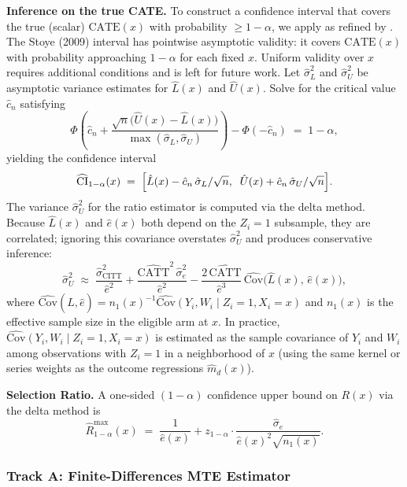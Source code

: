 \documentclass[11pt]{article}
\begin{document}
\textbf{Inference on the true CATE.}  To construct a confidence interval that
covers the true (scalar) $\mathrm{CATE}(x)$ with probability $\geq 1-\alpha$,
we apply \citet{imbens2004confidence} as refined by \citet{stoye2009more}.
The Stoye (2009) interval has pointwise asymptotic validity: it covers
$\mathrm{CATE}(x)$ with probability approaching $1-\alpha$ for each fixed $x$.
Uniform validity over $x$ requires additional conditions and is left for future
work.
Let $\hat{\sigma}_L^2$ and $\hat{\sigma}_U^2$ be asymptotic variance estimates
for $\hat{L}(x)$ and $\hat{U}(x)$.  Solve for the critical value $\hat{c}_n$
satisfying
\[
  \Phi\!\left(\hat{c}_n + \frac{\sqrt{n}\bigl(\hat{U}(x) -
  \hat{L}(x)\bigr)}{\max(\hat{\sigma}_L,\hat{\sigma}_U)}\right) -
  \Phi(-\hat{c}_n) \;=\; 1-\alpha,
\]
yielding the confidence interval
\[
  \widehat{\mathrm{CI}}_{1-\alpha}(x) \;=\; \Bigl[\hat{L}(x) -
  \hat{c}_n\,\hat{\sigma}_L/\sqrt{n},\;\;
  \hat{U}(x) + \hat{c}_n\,\hat{\sigma}_U/\sqrt{n}\Bigr].
\]
The variance $\hat{\sigma}_U^2$ for the ratio estimator is computed via the
delta method.  Because $\hat{L}(x)$ and $\hat{e}(x)$ both depend on the
$Z_i = 1$ subsample, they are correlated; ignoring this covariance overstates
$\hat{\sigma}_U^2$ and produces conservative inference:
\begin{equation}
  \hat{\sigma}_U^2 \;\approx\; \frac{\hat{\sigma}_{\mathrm{CITT}}^2}{\hat{e}^2}
  + \frac{\hat{\mathrm{CATT}}^2\,\hat{\sigma}_e^2}{\hat{e}^2}
  - \frac{2\,\hat{\mathrm{CATT}}}{\hat{e}^3}\,
    \widehat{\mathrm{Cov}}\!\bigl(\hat{L}(x),\,\hat{e}(x)\bigr),
  \label{eq:delta_var}
\end{equation}
where $\widehat{\mathrm{Cov}}(\hat{L},\hat{e}) =
n_1(x)^{-1}\widehat{\mathrm{Cov}}(Y_i, W_i \mid Z_i=1, X_i=x)$ and $n_1(x)$
is the effective sample size in the eligible arm at $x$.  In practice,
$\widehat{\mathrm{Cov}}(Y_i, W_i \mid Z_i=1, X_i=x)$ is estimated as the
sample covariance of $Y_i$ and $W_i$ among observations with $Z_i=1$ in a
neighborhood of $x$ (using the same kernel or series weights as the outcome
regressions $\hat{m}_d(x)$).

\textbf{Selection Ratio.}  A one-sided $(1-\alpha)$ confidence upper bound on
$R(x)$ via the delta method is
\[
  \hat{R}^{\max}_{1-\alpha}(x) \;=\; \frac{1}{\hat{e}(x)} +
  z_{1-\alpha}\cdot\frac{\hat{\sigma}_e}{\hat{e}(x)^2\sqrt{n_1(x)}}.
\]

\subsubsection{Track A: Finite-Differences MTE Estimator}
\end{document}
